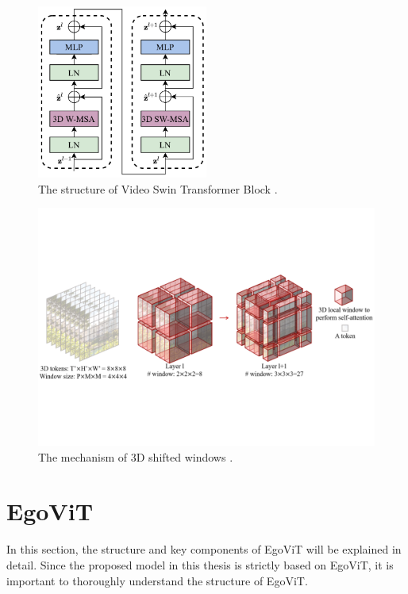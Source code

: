 \begin{figure}[htbp]
    \centering
    \includegraphics[width=0.5\textwidth]{graphics/swin_t_block.png}
    \caption{The structure of Video Swin Transformer Block \cite{liu_video_2021}.}
    \label{fig:swin-block}
\end{figure}
\clearpage
\vspace{5mm}
\begin{figure}[htbp]
    \centering
    \includegraphics[width=\textwidth]{graphics/shift_window.pdf}
    \caption{The mechanism of 3D shifted windows \cite{liu_video_2021}.}
    \label{fig:swin-msa}
\end{figure}

\section{EgoViT}
\label{sec:EgoViT}
In this section, the structure and key components of EgoViT will be explained in detail. Since the proposed model in this thesis is strictly based on EgoViT, it is important to thoroughly understand the structure of EgoViT.

